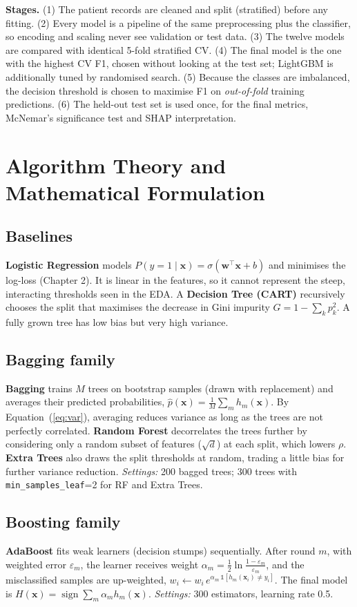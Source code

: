\textbf{Stages.} (1) The patient records are cleaned and split (stratified) before any fitting. (2) Every model is a
pipeline of the same preprocessing plus the classifier, so encoding and scaling never see validation or test data.
(3) The twelve models are compared with identical 5-fold stratified CV. (4) The final model is the one with the highest CV F1, chosen without
looking at the test set; LightGBM is additionally tuned by randomised search. (5) Because the classes are imbalanced, the decision threshold is chosen to maximise F1 on
\emph{out-of-fold} training predictions. (6) The held-out test set is used once, for the final metrics, McNemar's
significance test and SHAP interpretation.

\section{Algorithm Theory and Mathematical Formulation}
\subsection{Baselines}
\textbf{Logistic Regression} models $P(y=1\mid\mathbf x)=\sigma(\mathbf w^\top\mathbf x+b)$ and minimises the log-loss
(Chapter 2). It is linear in the features, so it cannot represent the steep, interacting thresholds seen in the EDA.
A \textbf{Decision Tree (CART)} recursively chooses the split that maximises the decrease in Gini impurity
$G=1-\sum_k p_k^2$. A fully grown tree has low bias but very high variance.

\subsection{Bagging family}
\textbf{Bagging} trains $M$ trees on bootstrap samples (drawn with replacement) and averages their predicted
probabilities, $\hat p(\mathbf x)=\frac1M\sum_m h_m(\mathbf x)$. By Equation~(\ref{eq:var}), averaging reduces variance
as long as the trees are not perfectly correlated. \textbf{Random Forest} decorrelates the trees further by considering
only a random subset of features ($\sqrt d$) at each split, which lowers $\rho$. \textbf{Extra Trees} also draws the
split thresholds at random, trading a little bias for further variance reduction.
\emph{Settings:} 200 bagged trees; 300 trees with \texttt{min\_samples\_leaf}=2 for RF and Extra Trees.

\subsection{Boosting family}
\textbf{AdaBoost} fits weak learners (decision stumps) sequentially. After round $m$, with weighted error
$\varepsilon_m$, the learner receives weight $\alpha_m=\tfrac12\ln\frac{1-\varepsilon_m}{\varepsilon_m}$, and the
misclassified samples are up-weighted, $w_i\leftarrow w_i\,e^{\alpha_m\,\mathbb 1[h_m(\mathbf x_i)\ne y_i]}$.
The final model is $H(\mathbf x)=\operatorname{sign}\sum_m\alpha_m h_m(\mathbf x)$.
\emph{Settings:} 300 estimators, learning rate 0.5.

